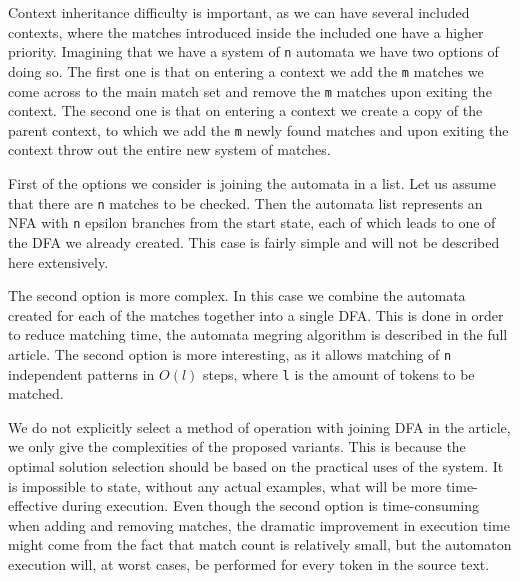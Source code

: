 Context inheritance difficulty is important, as we can have several included
contexts, where the matches introduced inside the included one have a higher
priority. Imagining that we have a system of \verb/n/ automata we have two
options of doing so. The first one is that on entering a context we add the
\verb/m/ matches we come across to the main match set and remove the \verb/m/
matches upon exiting the context. The second one is that on entering a context
we create a copy of the parent context, to which we add the \verb/m/ newly
found matches and upon exiting the context throw out the entire new system of
matches.

First of the options we consider is joining the automata in a list. Let us
assume that there are \verb/n/ matches to be checked. Then the automata list
represents an NFA with \verb/n/ epsilon branches from the start state, each of
which leads to one of the DFA we already created. This case is fairly simple
and will not be described here extensively.

The second option is more complex. In this case we combine the automata created
for each of the matches together into a single DFA. This is done in order to
reduce matching time, the automata megring algorithm is described in the full
article.  The second option is more interesting, as it allows matching of
\verb/n/ independent patterns in $O(l)$ steps, where \verb/l/ is the amount of
tokens to be matched.

We do not explicitly select a method of operation with joining DFA in the
article, we only give the complexities of the proposed variants. This is
because the optimal solution selection should be based on the practical uses of
the system. It is impossible to state, without any actual examples, what will
be more time-effective during execution. Even though the second option is
time-consuming when adding and removing matches, the dramatic improvement in
execution time might come from the fact that match count is relatively small,
but the automaton execution will, at worst cases, be performed for every token
in the source text.

